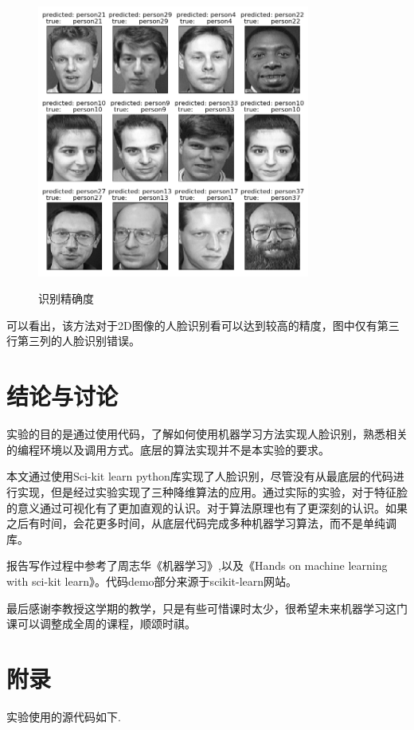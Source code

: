 \documentclass[UTF8]{ctexart}
\begin{document}
  \begin{figure}[H]
	  \centering
	  \label{fig:Per6A}\includegraphics[width=0.8\textwidth]{precision.png}\
	  \caption{识别精确度}
	  \label{fig:oscil}
	\end{figure}

可以看出，该方法对于2D图像的人脸识别看可以达到较高的精度，图中仅有第三行第三列的人脸识别错误。

\newpage
\section{结论与讨论}
实验的目的是通过使用代码，了解如何使用机器学习方法实现人脸识别，熟悉相关的编程环境以及调用方式。底层的算法实现并不是本实验的要求。\vspace{3mm}

本文通过使用Sci-kit learn python库实现了人脸识别，尽管没有从最底层的代码进行实现，但是经过实验实现了三种降维算法的应用。通过实际的实验，对于特征脸的意义通过可视化有了更加直观的认识。对于算法原理也有了更深刻的认识。如果之后有时间，会花更多时间，从底层代码完成多种机器学习算法，而不是单纯调库。\vspace{3mm}

报告写作过程中参考了周志华《机器学习》,以及《Hands on machine learning with sci-kit learn》。代码demo部分来源于scikit-learn网站。\vspace{3mm}

最后感谢李教授这学期的教学，只是有些可惜课时太少，很希望未来机器学习这门课可以调整成全周的课程，顺颂时祺。\vspace{3mm}

\newpage
\section{附录}
实验使用的源代码如下.  \vspace{5mm}
	
	\vspace{3mm}
\end{document}
